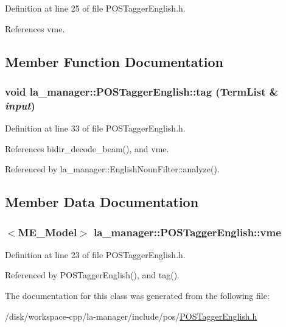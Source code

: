 Definition at line 25 of file POSTaggerEnglish.h.

References vme.

\subsection{Member Function Documentation}
\hypertarget{classla__manager_1_1POSTaggerEnglish_3f859b50241f70613b46747cc3736c8c}{
\subsubsection[{tag}]{\setlength{\rightskip}{0pt plus 5cm}void la\_\-manager::POSTaggerEnglish::tag ({\bf TermList} \& {\em input})}}
\label{classla__manager_1_1POSTaggerEnglish_3f859b50241f70613b46747cc3736c8c}




Definition at line 33 of file POSTaggerEnglish.h.

References bidir\_\-decode\_\-beam(), and vme.

Referenced by la\_\-manager::EnglishNounFilter::analyze().

\subsection{Member Data Documentation}
\hypertarget{classla__manager_1_1POSTaggerEnglish_08915bdebf896a890961c98d9a627cd2}{
\subsubsection[{vme}]{$<${\bf ME\_\-Model}$>$ {\bf la\_\-manager::POSTaggerEnglish::vme}}}
\label{classla__manager_1_1POSTaggerEnglish_08915bdebf896a890961c98d9a627cd2}




Definition at line 23 of file POSTaggerEnglish.h.

Referenced by POSTaggerEnglish(), and tag().

The documentation for this class was generated from the following file:\begin{CompactItemize}
\item 
/disk/workspace-cpp/la-manager/include/pos/\hyperlink{POSTaggerEnglish_8h}{POSTaggerEnglish.h}\end{CompactItemize}
